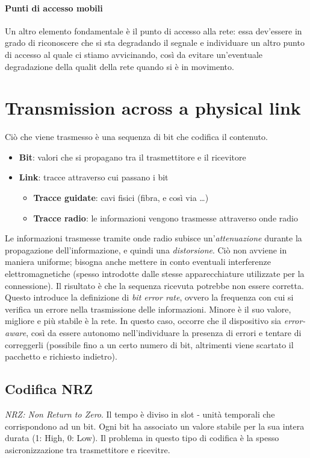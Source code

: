 \paragraph{Punti di accesso mobili}
Un altro elemento fondamentale è il punto di accesso alla rete: essa dev'essere in grado di riconoscere che si sta degradando il segnale e individuare un altro punto di accesso al quale ci stiamo avvicinando, così da evitare un'eventuale degradazione della qualit della rete quando si è in movimento.

\section{Transmission across a physical link}
Ciò che viene trasmesso è una sequenza di bit che codifica il contenuto.
\begin{itemize}
	\item \textbf{Bit}: valori che si propagano tra il trasmettitore e il ricevitore
	\item \textbf{Link}: tracce attraverso cui passano i bit
	\begin{itemize}
		\item \textbf{Tracce guidate}: cavi fisici (fibra, e così via \ldots)
		\item \textbf{Tracce radio}: le informazioni vengono trasmesse attraverso onde radio
	\end{itemize}
\end{itemize}

Le informazioni trasmesse tramite onde radio subisce un'\textit{attenuazione} durante la propagazione dell'informazione, e quindi una \textit{distorsione}.
Ciò non avviene in maniera uniforme; bisogna anche mettere in conto eventuali interferenze elettromagnetiche (spesso introdotte dalle stesse apparecchiature utilizzate per la connessione). Il risultato è che la sequenza ricevuta potrebbe non essere corretta. Questo introduce la definizione di \textit{bit error rate}, ovvero la frequenza con cui si verifica un errore nella trasmissione delle informazioni. Minore è il suo valore, migliore e più stabile è la rete.
In questo caso, occorre che il dispositivo sia \textit{error-aware}, così da essere autonomo nell'individuare la presenza di errori e tentare di correggerli (possibile fino a un certo numero di bit, altrimenti viene scartato il pacchetto e richiesto indietro).

\subsection{Codifica NRZ}
\textit{NRZ: Non Return to Zero}. Il tempo è diviso in slot - unità temporali che corrispondono ad un bit.
Ogni bit ha associato un valore stabile per la sua intera durata (1: High, 0: Low).
Il problema in questo tipo di codifica è la spesso asicronizzazione tra trasmettitore e ricevitre.

